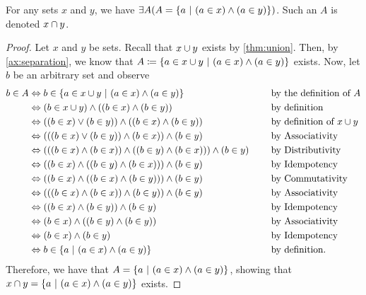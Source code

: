 \begin{theorem}\label{thm:intersection}
    For any sets \(x\) and \(y\),
    we have \(\exists A \pn*{A = \set*{a \suchthat (a \in x) \meet (a \in y)}}\).
    Such an \(A\) is denoted \(x \cap y\).
\end{theorem}
\begin{proof}
    Let \(x\) and \(y\) be sets. Recall that \(x \cup y\) exists by \autoref{thm:union}.
    Then, by \autoref{ax:separation},
    we know that \(A \defn \set*{a \in x \union y \suchthat (a \in x) \meet (a \in y)}\) exists.
    Now, let \(b\) be an arbitrary set and observe
    \begin{alignat*}{2}
        b \in A &\iff b \in \set*{a \in x \union y \suchthat (a \in x) \meet (a \in y)} &&\text{by the definition of \(A\)} \\
                &\iff (b \in x \union y) \meet \pn*{(b \in x) \meet (b \in y)} &&\text{by definition} \\
                &\iff \pn*{(b \in x) \join (b \in y)} \meet \pn*{(b \in x) \meet (b \in y)} &&\text{by definition of } x \union y \\
                &\iff \pn*{\pn*{(b \in x) \join (b \in y)} \meet (b \in x)} \meet (b \in y) &&\text{by Associativity} \\
                &\iff \pn*{\pn*{(b \in x) \meet (b \in x)} \meet \pn*{(b \in y) \meet (b \in x)}} \meet (b \in y)~~~~&&\text{by Distributivity} \\
                &\iff \pn*{(b \in x) \meet \pn*{(b \in y) \meet (b \in x)}} \meet (b \in y) &&\text{by Idempotency} \\
                &\iff \pn*{(b \in x) \meet \pn*{(b \in x) \meet (b \in y)}} \meet (b \in y) &&\text{by Commutativity} \\
                &\iff \pn*{\pn*{(b \in x) \meet (b \in x)} \meet (b \in y)} \meet (b \in y) &&\text{by Associativity} \\
                &\iff \pn*{(b \in x) \meet (b \in y)} \meet (b \in y) &&\text{by Idempotency} \\
                &\iff (b \in x) \meet \pn*{(b \in y) \meet (b \in y)} &&\text{by Associativity} \\
                &\iff (b \in x) \meet (b \in y) &&\text{by Idempotency} \\
                &\iff b \in \set*{a \suchthat (a \in x) \meet (a \in y)} &&\text{by definition}.
    \end{alignat*}
    Therefore, we have that \(A = \set*{a \suchthat (a \in x) \meet (a \in y)}\),
    showing that \(x \intersect y = \set*{a \suchthat (a \in x) \meet (a \in y)}\) exists.
\end{proof}

